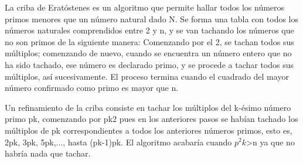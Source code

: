 La criba de Eratóstenes es un algoritmo que permite hallar todos los números primos menores que un número natural dado N. Se forma una tabla con todos los números naturales comprendidos entre 2 y n, y se van tachando los números que no son primos de la siguiente manera: Comenzando por el 2, se tachan todos sus múltiplos; comenzando de nuevo, cuando se encuentra un número entero que no ha sido tachado, ese número es declarado primo, y se procede a tachar todos sus múltiplos, así sucesivamente. El proceso termina cuando el cuadrado del mayor número confirmado como primo es mayor que n.

Un refinamiento de la criba consiste en tachar los múltiplos del k-ésimo número primo pk, comenzando por pk2 pues en los anteriores pasos se habían tachado los múltiplos de pk correspondientes a todos los anteriores números primos, esto es, 2pk, 3pk, 5pk,..., hasta (pk-1)pk. El algoritmo acabaría cuando $p^{2}k$>n ya que no habría nada que tachar.